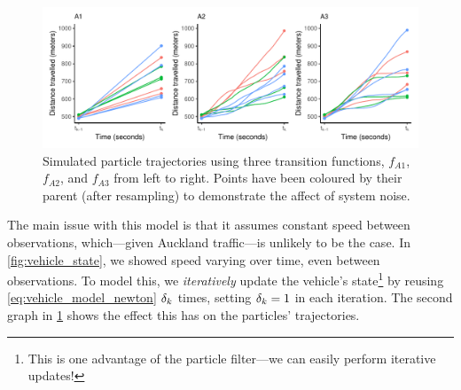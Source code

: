 \begin{knitrout}\small
{}\color{fgcolor}\begin{figure}

{\centering \includegraphics[width=\textwidth]{figure/transition_demo-1} 

}

\caption[Simulated particle trajectories using three transition functions]{Simulated particle trajectories using three transition functions, $f_{A1}$, $f_{A2}$, and $f_{A3}$ from left to right. Points have been coloured by their parent (after resampling) to demonstrate the affect of system noise.}\label{fig:transition_demo}
\end{figure}


\end{knitrout}

The main issue with this model is that it assumes constant speed between observations, which---given Auckland traffic---is unlikely to be the case. In \cref{fig:vehicle_state}, we showed speed varying over time, even between observations. To model this, we \emph{iteratively} update the vehicle's state\footnote{This is one advantage of the particle filter---we can easily perform iterative updates!} by reusing \cref{eq:vehicle_model_newton} $\delta_k$ times, setting $\delta_k=1$ in each iteration. The second graph in \cref{fig:transition_demo} shows the effect this has on the particles' trajectories.



